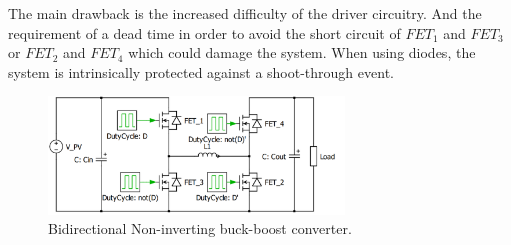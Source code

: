 The main drawback is the increased difficulty of the driver circuitry. And the requirement of a dead time in order to avoid the short circuit of $FET_1$ and $FET_3$ or $FET_2$ and $FET_4$ which could damage the system. When using diodes, the system is intrinsically protected against a shoot-through event. 	
		
\begin{figure}[htbp]
	\begin{center}
	\includegraphics[width=0.7\textwidth]{../Pictures/BID_H_B_BB}
	\caption{Bidirectional Non-inverting buck-boost converter.}
	\label{BID_N_INV_BB_SCHEMATIC}
	\end{center}
\end{figure}



